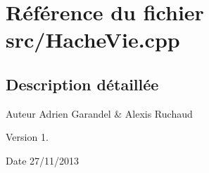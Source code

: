 \section{Référence du fichier src/\-Hache\-Vie.cpp}
\label{_hache_vie_8cpp}


\subsection{Description détaillée}
\begin{DoxyAuthor}{Auteur}
Adrien Garandel \& Alexis Ruchaud 
\end{DoxyAuthor}
\begin{DoxyVersion}{Version}
1. 
\end{DoxyVersion}
\begin{DoxyDate}{Date}
27/11/2013 
\end{DoxyDate}
